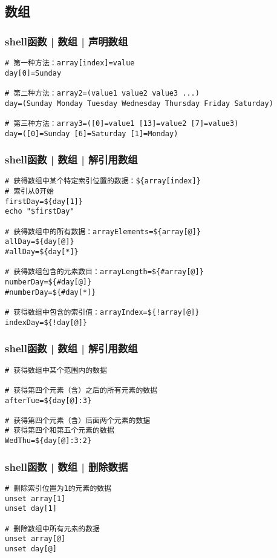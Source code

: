 \subsection{数组}
\begin{frame}[fragile]
  \frametitle{shell函数 | 数组 | 声明数组}
\begin{lstlisting}
# 第一种方法：array[index]=value
day[0]=Sunday

# 第二种方法：array2=(value1 value2 value3 ...)
day=(Sunday Monday Tuesday Wednesday Thursday Friday Saturday)

# 第三种方法：array3=([0]=value1 [13]=value2 [7]=value3)
day=([0]=Sunday [6]=Saturday [1]=Monday)
\end{lstlisting}
\end{frame}

\begin{frame}[fragile]
  \frametitle{shell函数 | 数组 | 解引用数组}
  \vspace{-0.5em}
\begin{lstlisting}
# 获得数组中某个特定索引位置的数据：${array[index]}
# 索引从0开始
firstDay=${day[1]}
echo "$firstDay"

# 获得数组中的所有数据：arrayElements=${array[@]}
allDay=${day[@]}
#allDay=${day[*]}

# 获得数组包含的元素数目：arrayLength=${#array[@]}
numberDay=${#day[@]}
#numberDay=${#day[*]}

# 获得数组中包含的索引值：arrayIndex=${!array[@]}
indexDay=${!day[@]}
\end{lstlisting}
\end{frame}

\begin{frame}[fragile]
  \frametitle{shell函数 | 数组 | 解引用数组}
\begin{lstlisting}
# 获得数组中某个范围内的数据

# 获得第四个元素（含）之后的所有元素的数据
afterTue=${day[@]:3}

# 获得第四个元素（含）后面两个元素的数据
# 获得第四个和第五个元素的数据
WedThu=${day[@]:3:2}
\end{lstlisting}
\end{frame}

\begin{frame}[fragile]
  \frametitle{shell函数 | 数组 | 删除数据}
\begin{lstlisting}
# 删除索引位置为1的元素的数据
unset array[1]
unset day[1]

# 删除数组中所有元素的数据
unset array[@]
unset day[@]
\end{lstlisting}
\end{frame}

